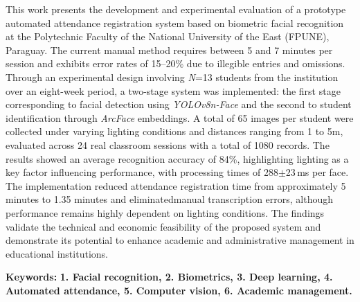 \documentclass[10pt,a4paper]{article}
\begin{document}
\begin{center}
{{This work presents the development and experimental evaluation of a prototype automated attendance registration system based on biometric facial recognition at the Polytechnic Faculty of the National University of the East (FPUNE), Paraguay. The current manual method requires between 5 and 7 minutes per session and exhibits error rates of 15–20\% due to illegible entries and omissions. Through an experimental design involving \textit{N}=13 students from the institution over an eight-week period, a two-stage system was implemented: the first stage corresponding to facial detection using \textit{YOLOv8n-Face}  and the second to student identification through \textit{ArcFace} embeddings. A total of 65 images per student were collected under varying lighting conditions and distances ranging from 1 to 5m, evaluated across 24 real classroom sessions with a total of 1080 records. The results showed an average recognition accuracy of 84\%, highlighting lighting as a key factor influencing performance, with processing times of 288$\pm$23\,ms per face. The implementation reduced attendance registration time from approximately 5 minutes to 1.35 minutes and eliminatedmanual transcription errors, although performance remains highly dependent on lighting conditions. The findings validate the technical and economic feasibility of the proposed system and demonstrate its potential to enhance academic and administrative management in educational institutions.


\vspace*{0.1cm}
\textbf{Keywords:} \textbf{1. Facial recognition, 2. Biometrics, 3. Deep learning, 4. Automated attendance, 5. Computer vision, 6. Academic management.}
}}
\end{center}

\vspace{.5cm}
\end{document}
